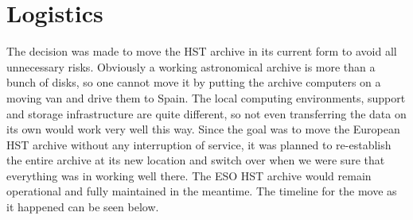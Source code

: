 \section{Logistics}


The decision was made to move the HST archive in its current form to avoid all unnecessary risks. Obviously a working astronomical archive is more than a bunch of disks, so one cannot move it  by putting the archive computers  on a moving van and drive them to Spain. The local computing environments, support and storage infrastructure are quite different, so not even transferring the data on its own would work very well this way. Since the goal was to move the European HST archive without any interruption of service, it was planned to re-establish the entire archive at its new location and switch over when we were sure that everything was in working well there. The ESO HST archive would remain operational and fully maintained in the meantime. The timeline for the move as it happened can be seen below.

